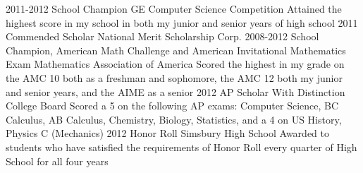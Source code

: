 \documentclass[]{friggeri-cv} %
\begin{document}
\begin{entrylist}
\entry
{2011-2012}
{School Champion}
{GE Computer Science Competition}
{Attained the highest score in my school in both my junior and senior years of high school}
\entry
{2011}
{Commended Scholar}
{National Merit Scholarship Corp.}
{}
\entry
{2008-2012}
{School Champion, American Math Challenge and American Invitational Mathematics Exam}
{Mathematics Association of America}
{Scored the highest in my grade on the AMC 10 both as a freshman and sophomore, the AMC 12 both my junior and senior years, and the AIME as a senior}
\entry
{2012}
{AP Scholar With Distinction}
{College Board}
{Scored a 5 on the following AP exams: Computer Science, BC Calculus, AB Calculus, Chemistry, Biology, Statistics, and a 4 on US History, Physics C (Mechanics)}
\entry
{2012}
{Honor Roll}
{Simsbury High School}
{Awarded to students who have satisfied the requirements of Honor Roll every quarter of High School for all four years}
\end{entrylist}
\end{document}
